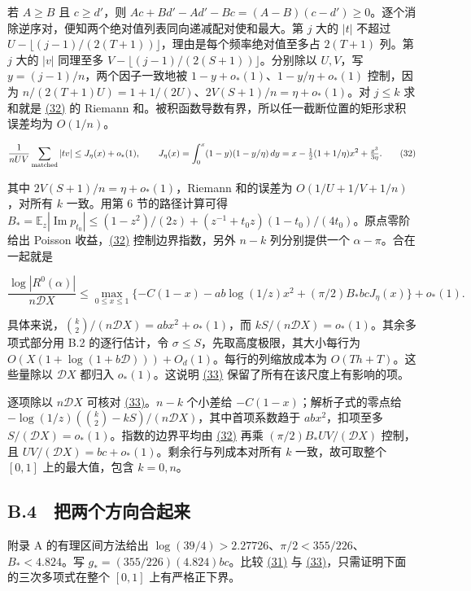 \documentclass[11pt,a4paper]{article}
\begin{document}
若 \(A\ge B\) 且 \(c\ge d'\)，则 \(Ac+Bd'-Ad'-Bc=(A-B)(c-d')\ge0\)。逐个消除逆序对，便知两个绝对值列表同向递减配对使和最大。第 \(j\) 大的 \(|t|\) 不超过 \(U-\lfloor(j-1)/(2(T+1))\rfloor\)，理由是每个频率绝对值至多占 \(2(T+1)\) 列。第 \(j\) 大的 \(|v|\) 同理至多 \(V-\lfloor(j-1)/(2(S+1))\rfloor\)。分别除以 \(U,V\)，写 \(y=(j-1)/n\)，两个因子一致地被 \(1-y+o_*(1)\)、\(1-y/\eta+o_*(1)\) 控制，因为 \(n/(2(T+1)U)=1+1/(2U)\)、\(2V(S+1)/n=\eta+o_*(1)\)。对 \(j\le k\) 求和就是 \hyperref[eq:32]{(32)} 的 Riemann 和。被积函数导数有界，所以任一截断位置的矩形求积误差均为 \(O(1/n)\)。

\[
 \frac1{nUV}\sum_{\rm matched}|t v|\le J_\eta(x)+o_*(1),\qquad
 J_\eta(x)=\int_0^x(1-y)(1-y/\eta)\,dy
 =x-\tfrac12(1+1/\eta)x^2+\tfrac{x^3}{3\eta}.                            \tag{32}\label{eq:32}
\]

其中 \(2V(S+1)/n=\eta+o_*(1)\)，Riemann 和的误差为 \(O(1/U+1/V+1/n)\)，对所有 \(k\) 一致。用第 6 节的路径计算可得 \(B_*=\mathbb E_z|\operatorname{Im}p_{t_0}|\le (1-z^2)/(2z)+(z^{-1}+t_0z)(1-t_0)/(4t_0)\)。原点零阶给出 Poisson 收益，\hyperref[eq:32]{(32)} 控制边界指数，另外 \(n-k\) 列分别提供一个 \(\alpha-\pi\)。合在一起就是

\[
 \frac{\log|R^0(\alpha)|}{n\mathscr D X}\le
 \max_{0\le x\le1}
 \{-C(1-x)-ab\log(1/z)x^2+(\pi/2)B_*bcJ_\eta(x)\}+o_*(1).               \tag{33}\label{eq:33}
\]

具体来说，\(\binom k2/(n\mathscr D X)=abx^2+o_*(1)\)，而 \(kS/(n\mathscr D X)=o_*(1)\)。其余多项式部分用 B.2 的逐行估计，令 \(\sigma\le S\)，先取高度极限，其大小每行为 \(O(X(1+\log(1+b\mathscr D)))+O_d(1)\)。每行的列缩放成本为 \(O(Th+T)\)。这些量除以 \(\mathscr D X\) 都归入 \(o_*(1)\)。这说明 \hyperref[eq:33]{(33)} 保留了所有在该尺度上有影响的项。

逐项除以 \(n\mathscr D X\) 可核对 \hyperref[eq:33]{(33)}。\(n-k\) 个小差给 \(-C(1-x)\)；解析子式的零点给 \(-\log(1/z)(\binom{k}{2}-kS)/(n\mathscr D X)\)，其中首项系数趋于 \(abx^2\)，扣项至多 \(S/(\mathscr D X)=o_*(1)\)。指数的边界平均由 \hyperref[eq:32]{(32)} 再乘 \((\pi/2)B_* UV/(\mathscr D X)\) 控制，且 \(UV/(\mathscr D X)=bc+o_*(1)\)。剩余行与列成本对所有 \(k\) 一致，故可取整个 \([0,1]\) 上的最大值，包含 \(k=0,n\)。

\subsection{B.4　把两个方向合起来}\label{b.4-ux628aux4e24ux4e2aux65b9ux5411ux5408ux8d77ux6765}

附录 A 的有理区间方法给出 \(\log(39/4)>2.27726\)、\(\pi/2<355/226\)、\(B_*<4.824\)。写 \(g_*=(355/226)(4.824)bc\)。比较 \hyperref[eq:31]{(31)} 与 \hyperref[eq:33]{(33)}，只需证明下面的三次多项式在整个 \([0,1]\) 上有严格正下界。
\end{document}

